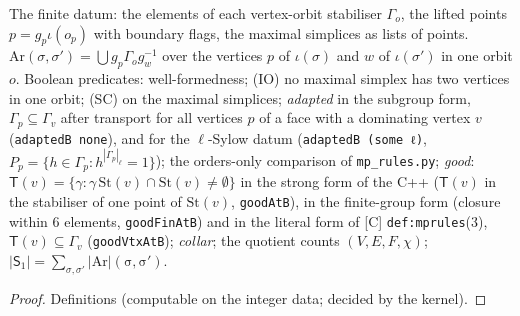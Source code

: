 \begin{definition}\label{def:mp-datum}
  \leanok
  The finite datum: the elements of each vertex-orbit stabiliser $\Gamma_o$, the lifted points $p=g_p\iota(o_p)$ with boundary
  flags, the maximal simplices as lists of points.  $\mathrm{Ar}(\sigma,\sigma')=\bigcup g_p\Gamma_og_w^{-1}$ over the vertices $p$ of
  $\iota(\sigma)$ and $w$ of $\iota(\sigma')$ in one orbit $o$.  Boolean predicates: well-formedness; (IO) no maximal simplex has two
  vertices in one orbit; (SC) on the maximal simplices; \emph{adapted} in the subgroup form, $\Gamma_p\subseteq\Gamma_v$ after transport
  for all vertices $p$ of a face with a dominating vertex $v$ (\texttt{adaptedB none}), and for the $\ell$-Sylow datum
  (\texttt{adaptedB (some ℓ)}, $P_p=\{h\in\Gamma_p:h^{|\Gamma_p|_\ell}=1\}$); the orders-only comparison of \texttt{mp\_rules.py};
  \emph{good}: $\mathsf T(v)=\{\gamma:\gamma\,\mathrm{St}(v)\cap\mathrm{St}(v)\ne\emptyset\}$ in the strong form of the C++ ($\mathsf T(v)$
  in the stabiliser of one point of $\mathrm{St}(v)$, \texttt{goodAtB}), in the finite-group form (closure within $6$ elements,
  \texttt{goodFinAtB}) and in the literal form of [C] \texttt{def:mprules}(3), $\mathsf T(v)\subseteq\Gamma_v$ (\texttt{goodVtxAtB});
  \emph{collar}; the quotient counts $(V,E,F,\chi)$; $\lvert \mathsf S_1\rvert=\sum_{\sigma,\sigma'}\lvert \mathrm{Ar\rvert(\sigma,\sigma')}$.
\end{definition}
\begin{proof}
  \leanok
  Definitions (computable on the integer data; decided by the kernel).
\end{proof}

